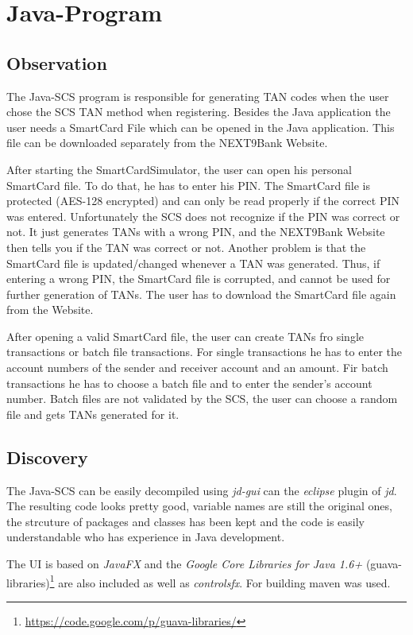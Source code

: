 \chapter{Java-Program}

\section{Observation}

The Java-SCS program is responsible for generating TAN codes when the user chose the SCS TAN method when registering. Besides the Java application the user needs a SmartCard File which can be opened in the Java application. This file can be downloaded separately from the NEXT9Bank Website.

After starting the SmartCardSimulator, the user can open his personal SmartCard file. To do that, he has to enter his PIN. The SmartCard file is protected (AES-128 encrypted) and can only be read properly if the correct PIN was entered. Unfortunately the SCS does not recognize if the PIN was correct or not. It just generates TANs with a wrong PIN, and the NEXT9Bank Website then tells you if the TAN was correct or not. Another problem is that the SmartCard file is updated/changed whenever a TAN was generated. Thus, if entering a wrong PIN, the SmartCard file is corrupted, and cannot be used for further generation of TANs. The user has to download the SmartCard file again from the Website.

After opening a valid SmartCard file, the user can create TANs fro single transactions or batch file transactions. For single transactions he has to enter the account numbers of the sender and receiver account and an amount. Fir batch transactions he has to choose a batch file and to enter the sender's account number. Batch files are not validated by the SCS, the user can choose a random file and gets TANs generated for it.

\section{Discovery}

The Java-SCS can be easily decompiled using \textit{jd-gui} can the \textit{eclipse} plugin of \textit{jd}. The resulting code looks pretty good, variable names are still the original ones, the strcuture of packages and classes has been kept and the code is easily understandable who has experience in Java development.

The UI is based on \textit{JavaFX} and the \textit{Google Core Libraries for Java 1.6+} (guava-libraries)\footnote{\url{https://code.google.com/p/guava-libraries/}} are also included as well as \textit{controlsfx}. For building maven was used.